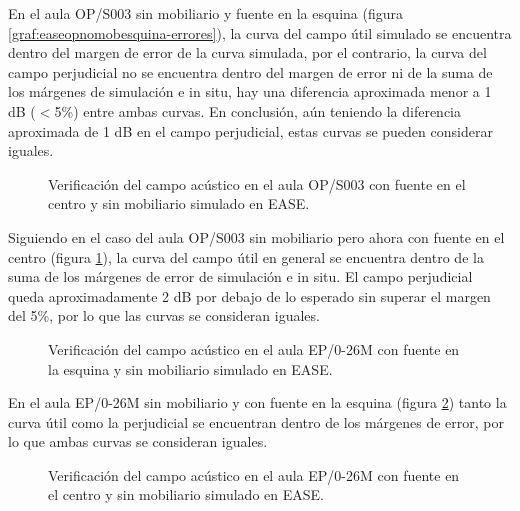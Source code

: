 En el aula OP/S003 sin mobiliario y fuente en la esquina (figura \ref{graf:easeopnomobesquina-errores}), la curva del campo útil simulado se encuentra dentro del margen de error de la curva simulada, por el contrario, la curva del campo perjudicial no se encuentra dentro del margen de error ni de la suma de los márgenes de simulación e in situ, hay una diferencia aproximada menor a 1 dB ($<$5\%) entre ambas curvas. En conclusión, aún teniendo la diferencia aproximada de 1 dB en el campo perjudicial, estas curvas se pueden considerar iguales.

\begin{figure}[ht]
    \centering%
    {%
    }
    \caption{Verificación del campo acústico en el aula OP/S003 con fuente en el centro y sin mobiliario simulado en EASE.}%
    \label{graf:easeopnomobcentro-errores}%
\end{figure}

Siguiendo en el caso del aula OP/S003 sin mobiliario pero ahora con fuente en el centro (figura \ref{graf:easeopnomobcentro-errores}), la curva del campo útil en general se encuentra dentro de la suma de los márgenes de error de simulación e in situ. El campo perjudicial queda aproximadamente 2 dB por debajo de lo esperado sin superar el margen del 5\%, por lo que las curvas se consideran iguales.

\begin{figure}[ht]
	\centering%
     {%
    }
    \caption{Verificación del campo acústico en el aula EP/0-26M con fuente en la esquina y sin mobiliario simulado en EASE.}%
     \label{graf:easeepsnomobesquina-errores}%
\end{figure}
\FloatBarrier

En el aula EP/0-26M sin mobiliario y con fuente en la esquina (figura \ref{graf:easeepsnomobesquina-errores}) tanto la curva útil como la perjudicial se encuentran dentro de los márgenes de error, por lo que ambas curvas se consideran iguales.
\begin{figure}[ht]
    \centering%
    {%
    }
    \caption{Verificación del campo acústico en el aula EP/0-26M con fuente en el centro y sin mobiliario simulado en EASE.}%
    \label{graf:easeepsnomobcentro-errores}%
    \vspace{-0.3cm}
\end{figure}

